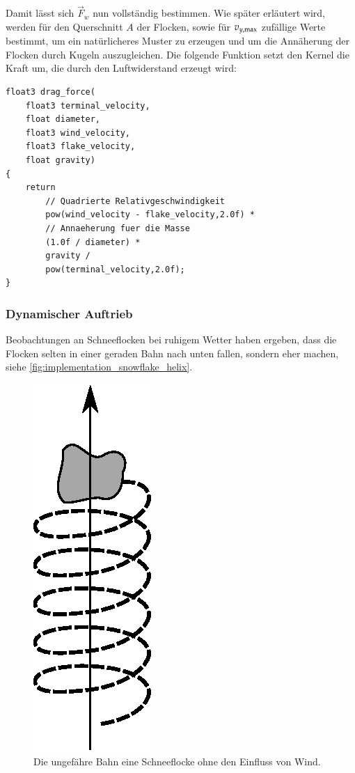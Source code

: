 Damit lässt sich $\vec{F}_w$ nun vollständig bestimmen. Wie später
erläutert wird, werden für den Querschnitt $A$ der Flocken, sowie für
$v_{y,\textnormal{max}}$ zufällige Werte bestimmt, um ein
natürlicheres Muster zu erzeugen und um die Annäherung der Flocken
durch Kugeln auszugleichen. Die folgende Funktion setzt den Kernel die
Kraft um, die durch den Luftwiderstand erzeugt wird:

\begin{verbatim}
float3 drag_force(
    float3 terminal_velocity,
    float diameter,
    float3 wind_velocity,
    float3 flake_velocity,
    float gravity)
{
    return
        // Quadrierte Relativgeschwindigkeit
        pow(wind_velocity - flake_velocity,2.0f) *
        // Annaeherung fuer die Masse
        (1.0f / diameter) *
        gravity /
        pow(terminal_velocity,2.0f);
}
\end{verbatim}

\subsubsection{Dynamischer Auftrieb}

Beobachtungen an Schneeflocken bei ruhigem Wetter haben ergeben, dass
die Flocken selten in einer geraden Bahn nach unten fallen, sondern
eher  machen, siehe
\autoref{fig:implementation_snowflake_helix}.

\begin{figure}[ht]
    \centering
    \includegraphics{images/snowflake_spiral}
    \caption{Die ungefähre Bahn eine Schneeflocke ohne den Einfluss von Wind.}
    \label{fig:implementation_snowflake_helix}
\end{figure}

